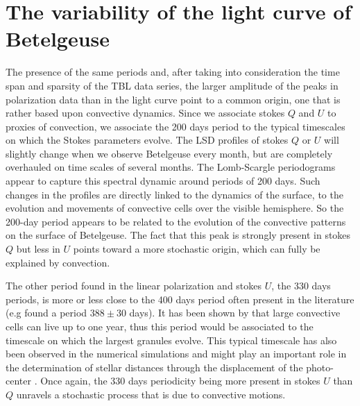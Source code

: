 \documentclass{aa}
\begin{document}
\section{The variability of the light curve of Betelgeuse}
\label{section 3}
The presence of the same 
periods and, after taking into consideration the time span and sparsity of the TBL data series, the larger amplitude of the peaks in
polarization data  than in the light curve point to a common origin, one that is rather based upon convective dynamics. Since we associate stokes $Q$ and $U$ to proxies of convection, we associate the 200 days period to the typical timescales on which the Stokes parameters evolve. 
The LSD profiles of stokes $Q$ or $U$ will slightly change when we observe Betelgeuse every month, but are completely overhauled 
on time scales of several months. The Lomb-Scargle periodograms appear to capture this spectral dynamic around periods of 200 days.
 Such changes in the profiles are directly linked to the dynamics of the surface,  to  the evolution and movements 
of convective cells over the visible hemisphere. So the 200-day period appears to be related to the evolution of the convective patterns 
on the surface of Betelgeuse.  The fact that this peak is strongly present in stokes $Q$ but less in $U$ points toward a more stochastic origin, which can fully be explained by convection.\

The other period found in the linear polarization and stokes $U$, the 330 days periods, is more or less close to the 400 days period often present in the literature (e.g \cite{kiss_variability_2006} found a period $388 \pm 30$ days). It has been shown by \cite{lopez_ariste_convective_2018} that large convective cells can live up to one year, thus this period would be associated to the timescale on which the largest granules evolve. This typical timescale has also been observed in the numerical simulations and might play an important role in the determination of stellar distances through the displacement of the photo-center \citep{chiavassa_probing_2022}. Once again, the 330 days periodicity being more present in stokes $U$ than $Q$ unravels a stochastic process that is due to convective motions. \
\end{document}
